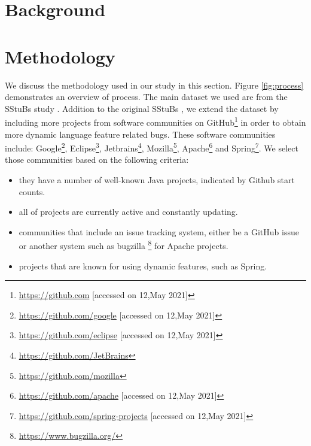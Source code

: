 \documentclass[sigconf,review,anonymous]{acmart}
\begin{document}
\section{Background}


\section{Methodology}
We discuss the methodology used in our study in this section. Figure \ref{fig:process} demonstrates an overview of process. The main dataset we used are from the SStuBs study \cite{karampatsis2020often}. Addition to the original SStuBs \cite{karampatsis2020often}, we extend the dataset by including more projects from software communities on GitHub\footnote{\url{https://github.com} [accessed on 12,May 2021]} in order to obtain more dynamic language feature related bugs. These software communities include: Google\footnote{\url{https://github.com/google} [accessed on 12,May 2021]}, Eclipse\footnote{\url{https://github.com/eclipse} [accessed on 12,May 2021]}, Jetbrains\footnote{\url{https://github.com/JetBrains}}, Mozilla\footnote{\url{https://github.com/mozilla}}, Apache\footnote{\url{https://github.com/apache} [accessed on 12,May 2021]} and Spring\footnote{\url{https://github.com/spring-projects} [accessed on 12,May 2021]}. We select those communities based on the following criteria:

\begin{itemize}
\item they have a number of well-known Java projects, indicated by Github start counts.
\item all of projects are currently active and constantly updating.
\item communities that include an issue tracking system, either be a GitHub issue or another system such as bugzilla \footnote{\url{https://www.bugzilla.org/}} for Apache projects.
\item projects that are known for using dynamic features, such as Spring.
\end{itemize}
\end{document}
